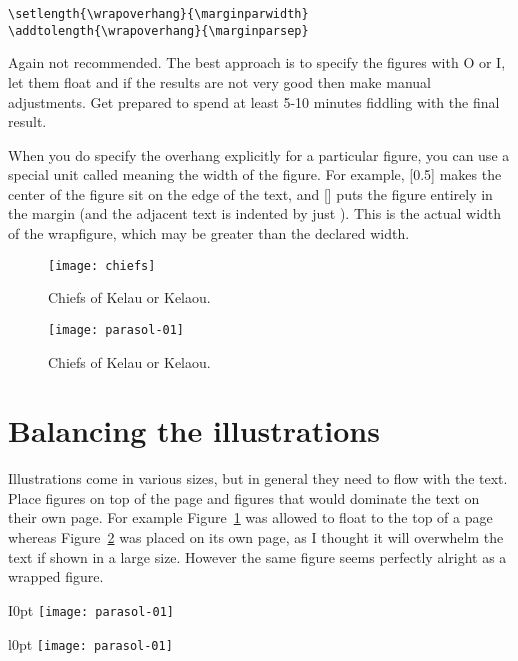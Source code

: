 \begin{verbatim}
\setlength{\wrapoverhang}{\marginparwidth}
\addtolength{\wrapoverhang}{\marginparsep}
\end{verbatim}

Again not recommended. The best approach is to specify the figures with O or I, let them float and if the results are
not very good then make manual adjustments. Get prepared to spend at least 5-10 minutes fiddling with the final result.

When you do specify the overhang explicitly for a particular figure, you can use a
special unit called \string\width meaning the width of the figure. For example, [0.5\string\width]
makes the center of the ﬁgure sit on the edge of the text, and [\string\width] puts the ﬁgure
entirely in the margin (and the adjacent text is indented by just \string\columnsep). This
\texttt{\string\width} is the actual width of the wrapfigure, which may be greater than the declared
width.

\begin{figure}[tb]
\texttt{[image: chiefs]}
\caption{Chiefs of Kelau or Kelaou.}
\label{fig:chiefs}
\end{figure}

\begin{figure}[p]
\centering

\texttt{[image: parasol-01]}
\caption{Chiefs of Kelau or Kelaou.}
\label{fig:parasol-01}
\end{figure}

\section{Balancing the illustrations}

Illustrations come in various sizes, but in general they need to flow with the text. Place figures on top of the page and figures that would dominate the text on their own page. For example Figure~\ref{fig:chiefs} was allowed to float to the top of a page whereas Figure~\ref{fig:parasol-01} was placed on its own page, as I thought it will overwhelm the text if shown in a large size. However the same figure seems perfectly alright as a wrapped figure.

\begin{texexample}{}{}
\begin{wrapfigure}{I}{0pt}
    \texttt{[image: parasol-01]}
 \end{wrapfigure}
\lipsum[1-2]
\begin{wrapfigure}{l}{0pt}
    \texttt{[image: parasol-01]}
 \end{wrapfigure}
\lipsum[1-2]
\end{texexample}



